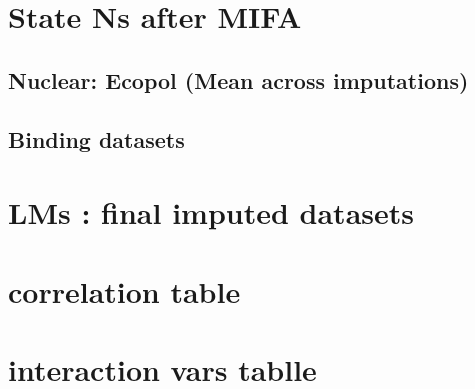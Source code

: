 \documentclass[
]{article}
\begin{document}
\hypertarget{state-ns-after-mifa}{%
\section{State Ns after MIFA}\label{state-ns-after-mifa}}

\hypertarget{nuclear-ecopol-mean-across-imputations}{%
\subsection{Nuclear: Ecopol (Mean across
imputations)}\label{nuclear-ecopol-mean-across-imputations}}

\hypertarget{binding-datasets}{%
\subsection{Binding datasets}\label{binding-datasets}}

\hypertarget{lms-final-imputed-datasets}{%
\section{LMs : final imputed
datasets}\label{lms-final-imputed-datasets}}

\hypertarget{correlation-table}{%
\section{correlation table}\label{correlation-table}}

\hypertarget{interaction-vars-tablle}{%
\section{interaction vars tablle}\label{interaction-vars-tablle}}
\end{document}
